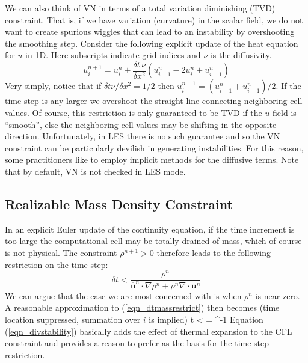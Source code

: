 We can also think of VN in terms of a total variation diminishing (TVD) constraint.  That is, if we have variation (curvature) in the scalar field, we do not want to create spurious wiggles that can lead to an instability by overshooting the smoothing step.  Consider the following explicit update of the heat equation for $u$ in 1D. Here subscripts indicate grid indices and $\nu$ is the diffusivity.
\begin{equation}
u_i^{n+1} = u_i^n + \frac{\delta t \, \nu}{\delta x^2} \left( u_{i-1}^n - 2u_i^n + u_{i+1}^n \right)
\end{equation}
Very simply, notice that if $\delta t \nu/\delta x^2 = 1/2$ then $u_i^{n+1} = (u_{i-1}^n + u_{i+1}^n)/2$.  If the time step is any larger we overshoot the straight line connecting neighboring cell values.  Of course, this restriction is only guaranteed to be TVD if the $u$ field is ``smooth'', else the neighboring cell values may be shifting in the opposite direction.  Unfortunately, in LES there is no such guarantee and so the VN constraint can be particularly devilish in generating instabilities. For this reason, some practitioners like to employ implicit methods for the diffusive terms. Note that by default, VN is not checked in LES mode.

\subsection{Realizable Mass Density Constraint}

In an explicit Euler update of the continuity equation, if the time increment is too large the computational cell may be totally drained of mass, which of course is not physical. The constraint $\rho^{n+1}>0$ therefore leads to the following restriction on the time step:
\begin{equation}
\label{eqn_dtmassrestrict}
\delta t < \frac{\rho^n}{\overline{\mathbf{u}}^n\cdot\nabla\rho^n + \rho^n \nabla\cdot\mathbf{u}^n}
\end{equation}
We can argue that the case we are most concerned with is when $\rho^n$ is near zero.  A reasonable approximation to (\ref{eqn_dtmassrestrict}) then becomes (time location suppressed, summation over $i$ is implied)
\be
\label{eqn_divstability}
\delta t <  = ^{-1}
\ee
Equation (\ref{eqn_divstability}) basically adds the effect of thermal expansion to the CFL constraint and provides a reason to prefer  as the basis for the time step restriction.

